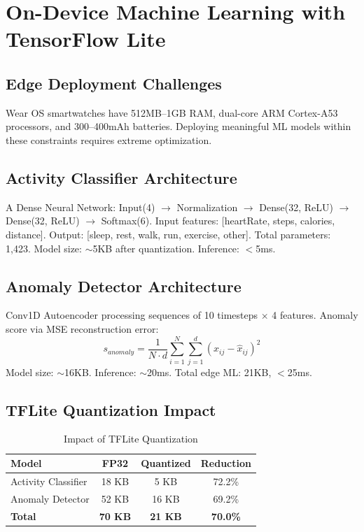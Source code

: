 \section{On-Device Machine Learning with TensorFlow Lite}

\subsection{Edge Deployment Challenges}
Wear OS smartwatches have 512MB--1GB RAM, dual-core ARM Cortex-A53 processors, and 300--400mAh batteries. Deploying meaningful ML models within these constraints requires extreme optimization.

\subsection{Activity Classifier Architecture}
A Dense Neural Network: Input(4) $\rightarrow$ Normalization $\rightarrow$ Dense(32, ReLU) $\rightarrow$ Dense(32, ReLU) $\rightarrow$ Softmax(6). Input features: [heartRate, steps, calories, distance]. Output: [sleep, rest, walk, run, exercise, other]. Total parameters: 1,423. Model size: $\sim$5KB after quantization. Inference: $<$5ms.

\subsection{Anomaly Detector Architecture}
Conv1D Autoencoder processing sequences of 10 timesteps $\times$ 4 features. Anomaly score via MSE reconstruction error:
\begin{equation}
s_{anomaly} = \frac{1}{N \cdot d} \sum_{i=1}^{N} \sum_{j=1}^{d} (x_{ij} - \hat{x}_{ij})^2
\end{equation}
Model size: $\sim$16KB. Inference: $\sim$20ms. Total edge ML: 21KB, $<$25ms.

\subsection{TFLite Quantization Impact}

\begin{table}[H]
\centering
\caption{Impact of TFLite Quantization}
\label{tab:quantization}
\begin{tabular}{lccc}
\toprule
\textbf{Model} & \textbf{FP32} & \textbf{Quantized} & \textbf{Reduction} \\
\midrule
Activity Classifier & 18 KB & 5 KB & 72.2\% \\
Anomaly Detector & 52 KB & 16 KB & 69.2\% \\
\textbf{Total} & \textbf{70 KB} & \textbf{21 KB} & \textbf{70.0\%} \\
\bottomrule
\end{tabular}
\end{table}


